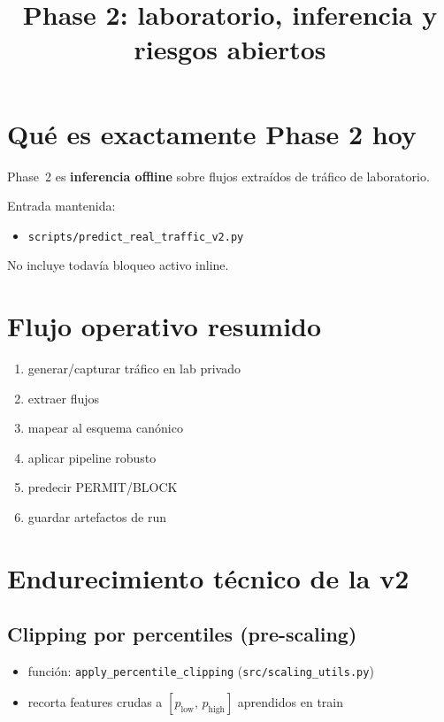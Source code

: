 ﻿\documentclass[12pt,a4paper]{article}
\title{Phase 2: laboratorio, inferencia y riesgos abiertos}
\date{}
\begin{document}
\maketitle

\section{Qué es exactamente Phase 2 hoy}

Phase~2 es \textbf{inferencia offline} sobre flujos extraídos de tráfico de laboratorio.

Entrada mantenida:

\begin{itemize}
  \item \verb|scripts/predict_real_traffic_v2.py|
\end{itemize}

No incluye todavía bloqueo activo inline.

\section{Flujo operativo resumido}

\begin{enumerate}
  \item generar/capturar tráfico en lab privado
  \item extraer flujos
  \item mapear al esquema canónico
  \item aplicar pipeline robusto
  \item predecir PERMIT/BLOCK
  \item guardar artefactos de run
\end{enumerate}

\section{Endurecimiento técnico de la v2}

\subsection{Clipping por percentiles (pre-scaling)}

\begin{itemize}
  \item función: \verb|apply_percentile_clipping| (\verb|src/scaling_utils.py|)
  \item recorta features crudas a \([p_{\text{low}},\, p_{\text{high}}]\) aprendidos en train
\end{itemize}
\end{document}
